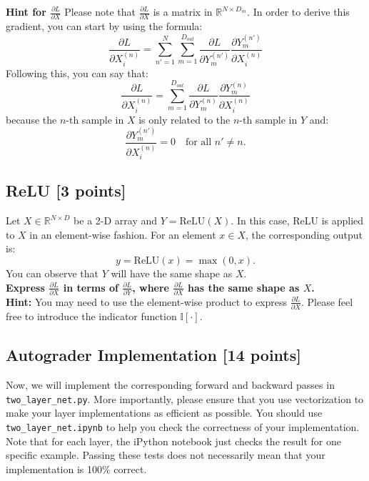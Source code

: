 \documentclass[lang=cn,11pt]{elegantbook}
\begin{document}
\textbf{Hint for \( \frac{\partial L}{\partial X} \)}
Please note that \( \frac{\partial L}{\partial X} \) is a matrix in \( \mathbb{R}^{N \times D_{in}} \). In order to derive this gradient, you can start by using the formula: \[
\frac{\partial L}{\partial X_i^{(n)}} = \sum_{n'=1}^{N} \sum_{m=1}^{D_{out}} \frac{\partial L}{\partial Y_m^{(n')}} \frac{\partial Y_m^{(n')}}{\partial X_i^{(n)}}
\]
Following this, you can say that: \[
\frac{\partial L}{\partial X_i^{(n)}} = \sum_{m=1}^{D_{out}} \frac{\partial L}{\partial Y_m^{(n)}} \frac{\partial Y_m^{(n)}}{\partial X_i^{(n)}}
\]
because the \( n \)-th sample in \( X \) is only related to the \( n \)-th sample in \( Y \) and: \[
\frac{\partial Y_m^{(n')}}{\partial X_i^{(n)}} = 0 \quad \text{for all } n' \neq n.
\]
\begin{solution}
\end{solution}

\subsection{ReLU [3 points]}

Let \( X \in \mathbb{R}^{N \times D} \) be a 2-D array and \( Y = \text{ReLU}(X) \). In this case, ReLU is applied to \( X \) in an element-wise fashion. For an element \( x \in X \), the corresponding output is: \[
y = \text{ReLU}(x) = \max(0, x).
\]
You can observe that \( Y \) will have the same shape as \( X \).\\
\textbf{Express \( \frac{\partial L}{\partial X} \) in terms of \( \frac{\partial L}{\partial Y} \), where \( \frac{\partial L}{\partial X} \) has the same shape as \( X \).\\}
\textbf{Hint:} You may need to use the element-wise product to express \( \frac{\partial L}{\partial X} \). Please feel free to introduce the indicator function \( \mathbb{I}[\cdot] \).
\begin{solution}
\end{solution}


\subsection{Autograder Implementation [14 points]}

Now, we will implement the corresponding forward and backward passes in \texttt{two\_layer\_net.py}. More importantly, please ensure that you use vectorization to make your layer implementations as efficient as possible. You should use \texttt{two\_layer\_net.ipynb} to help you check the correctness of your implementation. Note that for each layer, the iPython notebook just checks the result for one specific example. Passing these tests does not necessarily mean that your implementation is 100\% correct.
\end{document}
